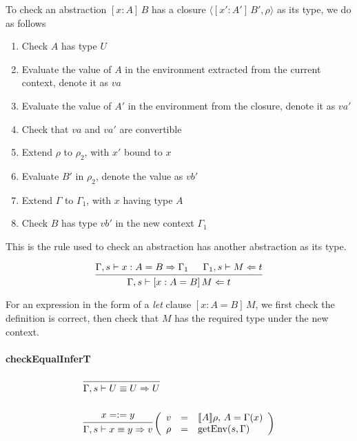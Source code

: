 \documentclass{article}
\theoremstyle{remark}
\begin{document}
To check an abstraction $[x : A] \, B$ has a closure $\langle [x' : A'] \, B', \rho \rangle$ as its type, we do as follows
\begin{enumerate}
\item Check $A$ has type $U$
\item Evaluate the value of $A$ in the environment extracted from the current context, denote it as $va$
\item Evaluate the value of $A'$ in the environment from the closure, denote it as $va'$
\item Check that $va$ and $va'$ are convertible
\item Extend $\rho$ to $\rho_2$, with $x'$ bound to $x$
\item Evaluate $B'$ in $\rho_2$, denote the value as $vb'$
\item Extend $\Gamma$ to $\Gamma_1$, with $x$ having type $A$
\item Check $B$ has type $vb'$ in the new context $\Gamma_1$
\end{enumerate}
This is the rule used to check an abstraction has another abstraction as its type.

\begin{align}
  \begin{prooftree}
    \hypo{\Gamma,s \vdash x : A = B \Rightarrow \Gamma_1}
    \hypo{\Gamma_1,s \vdash M \Leftarrow t}
    \infer2{\Gamma,s \vdash [x : A = B]\,M \Leftarrow t}
  \end{prooftree}
\end{align}

For an expression in the form of a \emph{let} clause $[x : A = B] \, M$, we first check the definition is correct, then check that $M$ has the required type under the new context.

\paragraph{checkEqualInferT}
\begin{align}
  &\begin{prooftree}
    \infer0{\Gamma,s \vdash U \equiv U \Rightarrow U} 
  \end{prooftree} \\
  \nonumber \\
  &\begin{prooftree}
    \hypo{x =:= y}
    \infer1{\Gamma,s \vdash x \equiv y \Rightarrow v} 
  \end{prooftree}\left(\begin{array}{l l l}
                         v &= & \llbracket A \rrbracket \rho, \, A = \Gamma(x) \\
                         \rho &= &\text{getEnv}(s, \Gamma)
                       \end{array}\right)
\end{align}
\end{document}
